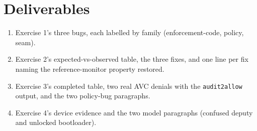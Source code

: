 \documentclass[12pt]{Training}
\begin{document}
\section*{Deliverables}
\begin{enumerate}
    \item Exercise 1's three bugs, each labelled by family (enforcement-code, policy, seam).
    \item Exercise 2's expected-vs-observed table, the three fixes, and one line per fix naming the reference-monitor property restored.
    \item Exercise 3's completed table, two real AVC denials with the \lstinline{audit2allow} output, and the two policy-bug paragraphs.
    \item Exercise 4's device evidence and the two model paragraphs (confused deputy and unlocked bootloader).
\end{enumerate}
\end{document}

